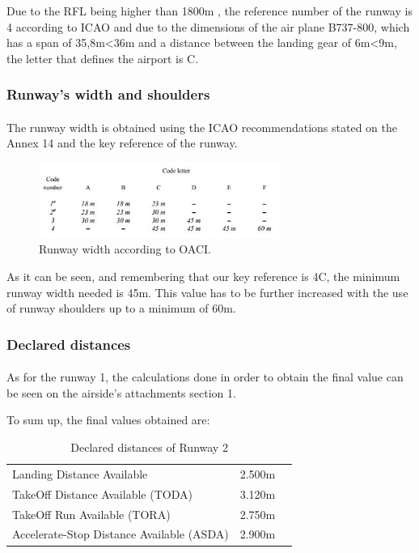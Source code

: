 		Due to the RFL being higher than 1800m , the reference number of the runway is 4 according to ICAO and due to the dimensions of the air plane B737-800, which has a span of 35,8m<36m and a distance between the landing gear of 6m<9m, the letter that defines the airport is C.
	
		\subsubsection{Runway's width and shoulders}
		\paragraph{}The runway width is obtained using the ICAO recommendations stated on the Annex 14 and the key reference of the runway. 
	
		\begin{figure}[H]
			\centering
			\includegraphics[clip, trim=0cm 0cm 0cm 0cm, width=0.7\textwidth]{./images/Annex14/RunwayWidth}
			\caption{Runway width according to OACI.} %
			\label{} %
		\end{figure}
	
		As it can be seen, and remembering that our key reference is 4C, the minimum runway width needed is 45m. This value has to be further increased with the use of runway shoulders up to a minimum of 60m. 
	
		\subsubsection{Declared distances}
		\paragraph{} As for the runway 1, the calculations done in order to obtain the final value can be seen on the airside’s attachments section 1. 
	
		To sum up, the final values obtained are:
	
		\begin{table}[htb]
			\centering
			\begin{tabular}{ll p{5cm}}
				\midrule[2pt]
				Landing Distance Available & 2.500m\\
				TakeOff Distance Available (TODA) & 3.120m\\
				TakeOff Run Available (TORA)& 2.750m\\
				Accelerate-Stop Distance Available (ASDA)& 2.900m\\
				\bottomrule[2pt]
			\end{tabular}
			\caption{Declared distances of  Runway 2}
			\label{DeclareddistancesRW2}
		\end{table}
	
